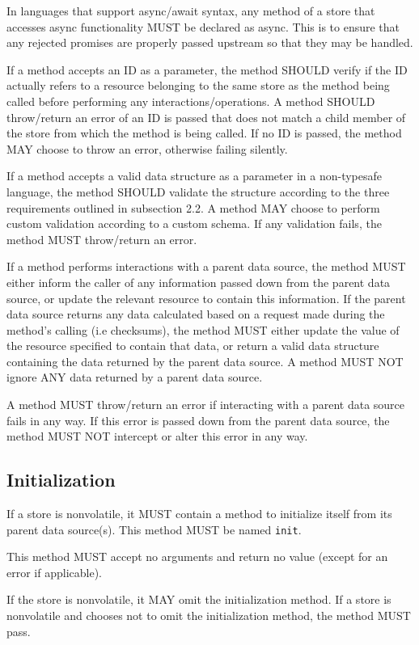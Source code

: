 \documentclass{article}
\begin{document}
In languages that support async/await syntax, any method of a store that accesses async functionality MUST be declared as async. This is to ensure that any rejected promises are properly passed upstream so that they may be handled.

If a method accepts an ID as a parameter, the method SHOULD verify if the ID actually refers to a resource belonging to the same store as the method being called before performing any interactions/operations. A method SHOULD throw/return an error of an ID is passed that does not match a child member of the store from which the method is being called. If no ID is passed, the method MAY choose to throw an error, otherwise failing silently.

If a method accepts a valid data structure as a parameter in a non-typesafe language, the method SHOULD validate the structure according to the three requirements outlined in subsection 2.2. A method MAY choose to perform custom validation according to a custom schema. If any validation fails, the method MUST throw/return an error.

If a method performs interactions with a parent data source, the method MUST either inform the caller of any information passed down from the parent data source, or update the relevant resource to contain this information. If the parent data source returns any data calculated based on a request made during the method's calling (i.e checksums), the method MUST either update the value of the resource specified to contain that data, or return a valid data structure containing the data returned by the parent data source. A method MUST NOT ignore ANY data returned by a parent data source.

A method MUST throw/return an error if interacting with a parent data source fails in any way. If this error is passed down from the parent data source, the method MUST NOT intercept or alter this error in any way.

\subsection{Initialization}
If a store is nonvolatile, it MUST contain a method to initialize itself from its parent data source(s). This method MUST be named \verb|init|.

This method MUST accept no arguments and return no value (except for an error if applicable).

If the store is nonvolatile, it MAY omit the initialization method. If a store is nonvolatile and chooses not to omit the initialization method, the method MUST pass.
\end{document}
